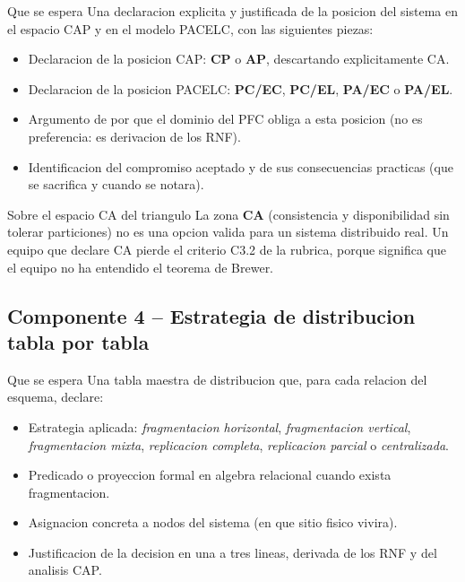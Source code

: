 \documentclass[11pt,a4paper]{article}
\begin{document}
\begin{cajadefinicion}{Que se espera}
Una declaracion explicita y justificada de la posicion del sistema en el espacio CAP y en el modelo PACELC, con las siguientes piezas:
\begin{itemize}
\item Declaracion de la posicion CAP: \textbf{CP} o \textbf{AP}, descartando explicitamente CA.
\item Declaracion de la posicion PACELC: \textbf{PC/EC}, \textbf{PC/EL}, \textbf{PA/EC} o \textbf{PA/EL}.
\item Argumento de por que el dominio del PFC obliga a esta posicion (no es preferencia: es derivacion de los RNF).
\item Identificacion del compromiso aceptado y de sus consecuencias practicas (que se sacrifica y cuando se notara).
\end{itemize}
\end{cajadefinicion}

\begin{cajaalerta}{Sobre el espacio CA del triangulo}
La zona \textbf{CA} (consistencia y disponibilidad sin tolerar particiones) no es una opcion valida para un sistema distribuido real. Un equipo que declare CA pierde el criterio C3.2 de la rubrica, porque significa que el equipo no ha entendido el teorema de Brewer.
\end{cajaalerta}

\subsection{Componente 4 -- Estrategia de distribucion tabla por tabla}

\begin{cajadefinicion}{Que se espera}
Una tabla maestra de distribucion que, para cada relacion del esquema, declare:
\begin{itemize}
\item Estrategia aplicada: \emph{fragmentacion horizontal}, \emph{fragmentacion vertical}, \emph{fragmentacion mixta}, \emph{replicacion completa}, \emph{replicacion parcial} o \emph{centralizada}.
\item Predicado o proyeccion formal en algebra relacional cuando exista fragmentacion.
\item Asignacion concreta a nodos del sistema (en que sitio fisico vivira).
\item Justificacion de la decision en una a tres lineas, derivada de los RNF y del analisis CAP.
\end{itemize}
\end{cajadefinicion}
\end{document}
